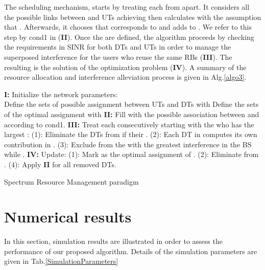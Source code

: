 \documentclass[conference,onecolumn,12pt]{IEEEtran}
\begin{document}
The scheduling mechanism, starts by treating each  from  apart. It considers all the possible links between  and UTs achieving  then calculates  with the assumption that . Afterwards, it chooses  that corresponds to  and adds  to . We refer to this step by cond1 in (\textbf{II}). Once the  are defined, the algorithm proceeds by checking the requirements in SINR for both DTs and UTs in order to manage the superposed interference for the users who reuse the same RBs (\textbf{III}). The resulting  is the solution of the optimization problem (\textbf{IV}). A summary of the resource allocation and interference alleviation process is given in Alg.\ref{algo3}.
\begin{algorithm}
\DontPrintSemicolon
\textbf{I:} Initialize the network parameters: \\
Define the sets  of possible assignment between UTs and DTs with \;
Define the sets  of the optimal assignment with \;
\textbf{II:} Fill  with the possible association between  and  according to cond1.\;
 {
\textbf{III:} Treat each  consecutively starting with the  who has the largest :\;
(1): Eliminate the DTs from  if their .\;
(2): Each DT in  computes its own contribution in .\;
(3): Exclude from  the  with the greatest interference in the BS while .\;
\textbf{IV:} Update:\;
(1): Mark  as the optimal assignment of .\;
(2): Eliminate  from .\;
(4): Apply \textbf{II} for all removed DTs.
}
\caption{Spectrum Resource Management paradigm\label{algo3}}
\end{algorithm}

\section{Numerical results}
In this section, simulation results are illustrated in order to assess the performance of our proposed algorithm. Details of the simulation parameters are given in Tab.\ref{SimulationParameters}
\end{document}
